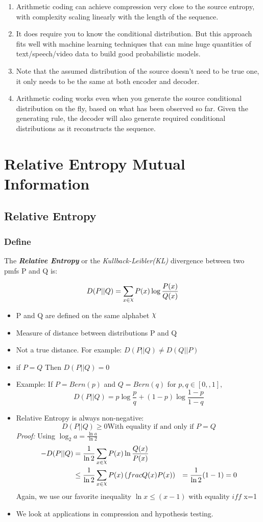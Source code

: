 \documentclass[12pt]{article}
\DeclareRobustCommand{\rchi}{{\mathpalette\irchi\relax}}
\newcommand{\irchi}[2]{\raisebox{\depth}{$#1\chi$}} %
\begin{document}
\begin{enumerate}
\item Arithmetic coding can achieve compression very close to the source entropy, with complexity scaling linearly with the length of the sequence.
\item It does require you to know the conditional distribution. But this approach fits well with machine learning techniques that can mine huge quantities of text/speech/video data to build good probabilistic models.
\item Note that the assumed distribution of the source doesn't need to be true one, it only needs to be the same at both encoder and decoder.
\item Arithmetic coding works even when you generate the source conditional distribution on the fly, based on what has been observed so far. Given the generating rule, the decoder will also generate required conditional distributions as it reconstructs the sequence.
\end{enumerate}

\section{Relative Entropy Mutual Information}
\subsection{Relative Entropy}
\subsubsection{Define}
The \textbf{\textit{Relative Entropy}} or the \textit{Kullback-Leibler(KL)} divergence between two pmfs P and Q is:

\[
D(P||Q) = \sum_{x \in \rchi}P(x)\log\frac{P(x)}{Q(x)}
\]

\begin{itemize}
\item P and Q are defined on the same alphabet $\rchi$
\item Measure of distance between distributions  P and Q
\item Not a true distance. For example:  $D(P||Q) \not = D(Q||P)$
\item if $P=Q$ Then $D(P||Q) = 0$
\item Example: If $P= Bern(p) $ and $Q= Bern(q)$ for $p,q \in [0,,1],$
\[
D(P||Q) = p\log\frac{p}{q} + (1-p)\log\frac{1-p}{1-q}
\] 
\item Relative Entropy is always non-negative:
\[
D(P||Q) \ge 0 \textrm{With equality if and only if } P=Q
\]
\textit{Proof:} Using $\log_2a = \frac{\ln a}{\ln 2}$
\begin{align*}
-D(P||Q) & = \frac{1}{\ln 2} \sum_{x \in \rchi} P(x) \ln\frac{Q(x)}{P(x)} \\
& \le  \frac{1}{\ln 2} \sum_{x \in \rchi} P(x)\left( frac{Q(x)}{P(x)}\right) 
& = \frac{1}{\ln 2} (1-1) = 0
\end{align*}
Again, we use our favorite inequality $\ln x \le (x-1)$ with equality $iff$  x=1
\item We look at applications in \textcolor{blue1}{compression} and \textcolor{blue1}{hypothesis testing}.
\end{itemize}
\end{document}
